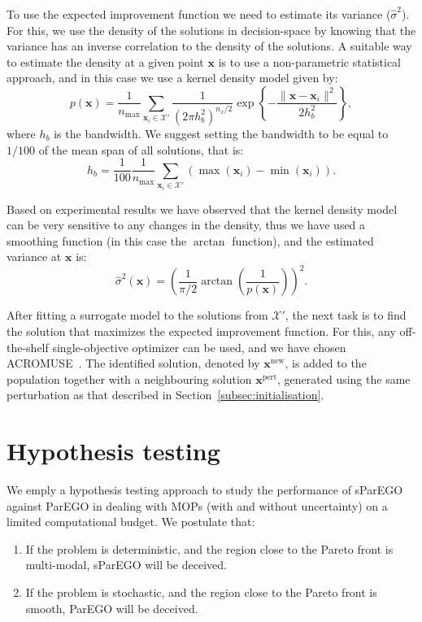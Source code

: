 \documentclass{llncs}
\newcommand{\vx}{\mathbf{x}} %
\newcommand{\XSet}{\mathcal{X}} %
\begin{document}
To use the expected improvement function we need to estimate its variance ($\hat{\sigma}^2$). For this, we use the density of the solutions in decision-space by knowing that the variance has an inverse correlation to the density of the solutions. A suitable way to estimate the density at a given point $\vx$ is to use a non-parametric statistical approach, and in this case we use a kernel density model given by:
\begin{equation}
 p(\vx) = \frac{1}{n_{\text{max}}} \sum_{\vx_i \in \XSet'} \frac{1}{(2\pi h_b^2)^{n_x/2}}   \exp\left\{-\frac{\| \vx-\vx_i \|^2}{2h_b^2}\right\},
\end{equation}
where $h_b$ is the bandwidth. We suggest setting the bandwidth to be equal to $1/100$ of the mean span of all solutions, that is:
\begin{equation}
 h_b = \frac{1}{100} \frac{1}{n_{\text{max}}} \sum_{\vx_i \in \XSet'} (\max(\vx_i) - \min(\vx_i)).
\end{equation}

Based on experimental results we have observed that the kernel density model can be very sensitive to any changes in the density, thus we have used a smoothing function (in this case the $\arctan$ function), and the estimated variance at $\vx$ is:
\begin{equation}
 \hat{\sigma}^2(\vx) = \left( \frac{1}{\pi/2} \arctan \left(\frac{1}{p(\vx)}\right) \right)^2.
\end{equation}

After fitting a surrogate model to the solutions from $\XSet'$, the next task is to find the solution that maximizes the expected improvement function. For this, any off-the-shelf single-objective optimizer can be used, and we have chosen ACROMUSE~\cite{Ginley2011}. The identified solution, denoted by $\vx^\text{new}$, is added to the population together with a neighbouring solution $\vx^\text{pert}$, generated using the same perturbation as that described in Section~\ref{subsec:initialisation}.

\section{Hypothesis testing}\label{sec:test_suite}


We emply a hypothesis testing approach to study the performance of sParEGO against ParEGO in dealing with MOPs (with and without uncertainty) on a limited computational budget. We postulate that:
\begin{enumerate}
 \item If the problem is deterministic, and the region close to the Pareto front is multi-modal, sParEGO will be deceived.
 \item If the problem is stochastic, and the region close to the Pareto front is smooth, ParEGO will be deceived.
\end{enumerate}
\end{document}
